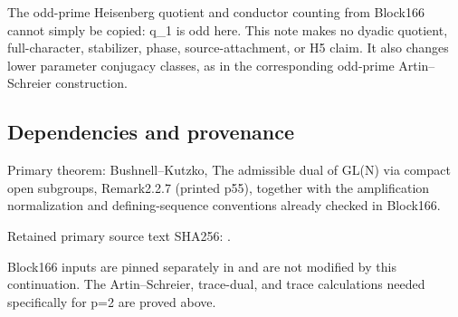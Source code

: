 The odd-prime Heisenberg quotient and conductor counting from Block166
cannot simply be copied: q\_1 is odd here. This note makes no dyadic
quotient, full-character, stabilizer, phase, source-attachment, or H5
claim. It also changes lower parameter conjugacy classes, as in the
corresponding odd-prime Artin--Schreier construction.

\hypertarget{dyadic_tower-dependencies-and-provenance}{%
\subsection{Dependencies and
provenance}\label{dyadic_tower-dependencies-and-provenance}}

Primary theorem: Bushnell--Kutzko, The admissible dual of GL(N) via
compact open subgroups, Remark2.2.7 (printed p55), together with the
amplification normalization and defining-sequence conventions already
checked in Block166.

Retained primary source text SHA256:
.

Block166 inputs are pinned separately in  and are not
modified by this continuation. The Artin--Schreier, trace-dual, and
trace calculations needed specifically for p=2 are proved above.
